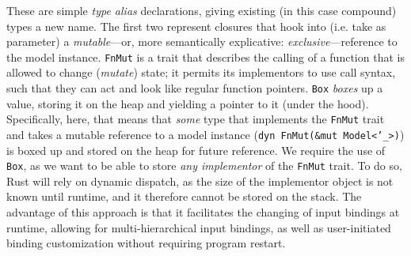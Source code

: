 These  are   simple  \textit{type  alias}  declarations,   giving  existing  (in
this  case  compound)  types  a  new name.  The  first  two  represent  closures
that   hook   into   (i.e.   take   as   parameter)   a   \textit{mutable}---or,
more  semantically  explicative:  \textit{exclusive}---reference  to  the  model
instance\cite{therustbook}. \texttt{FnMut}  is a trait  that describes
the calling of a function that  is allowed to change (\textit{mutate}) state; it
permits its  implementors to use  call syntax, such that  they can act  and look
like  regular  function  pointers. \texttt{Box}  \textit{boxes}  up  a
value, storing  it on the heap  and yielding a  pointer to it (under  the hood).
Specifically,  here, that  means  that \textit{some}  type  that implements  the
\texttt{FnMut} trait and takes a mutable reference to a model instance
(\texttt{dyn FnMut(&mut  Model<'_>)}) is  boxed up  and stored  on the
heap  for  future  reference.  We require  the  use  of  \texttt{Box},
as   we  want   to   be  able   to  store   \textit{any   implementor}  of   the
\texttt{FnMut} trait. To do so, Rust will rely on dynamic dispatch, as
the size of the implementor object is  not known until runtime, and it therefore
cannot  be stored  on the  stack\cite{rustclosureshard}. The  advantage of  this
approach  is that  it facilitates  the changing  of input  bindings at  runtime,
allowing  for  multi-hierarchical  input  bindings, as  well  as  user-initiated
binding customization without requiring program restart.


